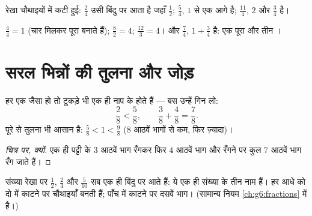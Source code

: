\begin{omfigure}

{\small रेखा चौथाइयों में कटी हुई: $\frac24$ उसी बिंदु पर आता है
जहाँ $\frac12$; $\frac54$, $1$ से एक  आगे है; $\frac{11}{4}$,
$2$ और $\frac34$ है।}
\end{omfigure}

\begin{example}[भिन्नों में छिपी पूर्ण संख्याएँ]\label{ex:g4:fractions:whole}
$\frac44 = 1$ (चार  मिलकर पूरा बनाते हैं); $\frac82 = 4$;
$\frac{12}{3} = 4$। और $\frac74$, $1 + \frac34$ है: एक पूरा और
तीन ।
\end{example}

\section{सरल भिन्नों की तुलना और जोड़}

\begin{proposition}[एक ही हर]\label{prop:g4:fractions:compare}
हर एक जैसा हो तो टुकड़े भी एक ही नाप के होते हैं --- बस उन्हें
गिन लो:
\[
\frac{2}{8} < \frac{5}{8},
\qquad
\frac{3}{8} + \frac{4}{8} = \frac{7}{8}.
\]
पूरे से तुलना भी आसान है: $\frac{5}{8} < 1 < \frac{9}{8}$
($8$ आठवें भागों से कम, फिर ज़्यादा)।
\end{proposition}

\begin{proof}[चित्र पर, क्यों]
एक ही पट्टी के $3$ आठवें भाग रँगकर फिर $4$ आठवें भाग और रँगने
पर कुल $7$ आठवें भाग रँग जाते हैं।
\end{proof}

\begin{example}\label{ex:g4:fractions:equal}
संख्या रेखा पर $\frac12$, $\frac24$ और $\frac{5}{10}$ सब एक ही
बिंदु पर आते हैं: ये एक ही संख्या के तीन नाम हैं। हर आधे को दो
में काटने पर चौथाइयाँ बनती हैं; पाँच में काटने पर दसवें भाग।
(सामान्य नियम \cref{ch:g6:fractions} में है।)
\end{example}

